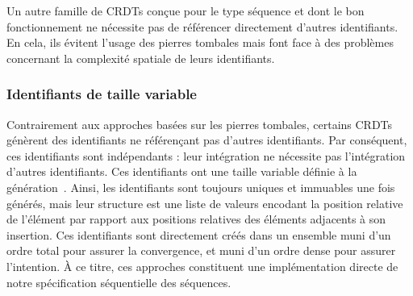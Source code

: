 Un autre famille de CRDTs conçue pour le type séquence et dont le bon
fonctionnement ne nécessite pas de référencer directement d'autres
identifiants. En cela, ils évitent l'usage des pierres tombales mais font face à
des problèmes concernant la complexité spatiale de leurs identifiants.

\subsubsection{Identifiants de taille variable}

Contrairement aux approches basées sur les pierres tombales, certains CRDTs
génèrent des identifiants ne référençant pas d'autres identifiants. Par
conséquent, ces identifiants sont indépendants : leur intégration ne nécessite
pas l'intégration d'autres identifiants. Ces identifiants ont une taille
variable définie à la génération~\cite{andre2013supporting,
  preguica2009commutative, weiss2009logoot}.  Ainsi, les identifiants sont
toujours uniques et immuables une fois générés, mais leur structure est une
liste de valeurs encodant la position relative de l'élément par rapport aux
positions relatives des éléments adjacents à son insertion. Ces identifiants
sont directement créés dans un ensemble muni d'un ordre total pour assurer la
convergence, et muni d'un ordre dense pour assurer l'intention. À ce titre, ces
approches constituent une implémentation directe de notre spécification
séquentielle des séquences.



